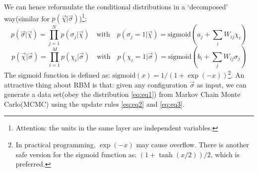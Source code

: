 \documentclass[letterpaper, 10pt]{article}
\begin{document}
We can hence reformulate the conditional distributions in a `decomposed' way(similar for $p(\vec{\chi}|\vec{\sigma})$)\footnote{Attention: the units in the same layer are independent variables.}:
\begin{equation}
p(\vec{\sigma}|\vec{\chi}) = \prod_{j=1}^{N} p(\sigma_j | \vec{\chi}) \quad{} \mathrm{with} \quad{} p(\sigma_j=1 | \vec{\chi}) = \mathrm{sigmoid}(a_j + \sum_i W_{ij}\chi_i) \label{eq:eq2}
\end{equation}
\begin{equation}
p(\vec{\chi}|\vec{\sigma}) = \prod_{i=1}^{M} p(\chi_i | \vec{\sigma}) \quad{} \mathrm{with} \quad{} p(\chi_i=1 | \vec{\sigma}) = \mathrm{sigmoid}(b_i + \sum_j W_{ij}\sigma_j)\label{eq:eq3}
\end{equation}
The sigmoid function is defined as: $\mathrm{sigmoid}(x) = 1/(1+\exp{(-x)})$\footnote{In practical programming, $\exp(-x)$ may cause overflow. There is another safe version for the sigmoid function as: $(1+\tanh{(x/2)})/2$, which is preferred.}. An attractive thing about RBM is that: given any configuration $\vec{\sigma}$ as input, we can generate a data set(obey the distribution \ref{eq:eq1}) from Markov Chain Monte Carlo(MCMC) using the update rules \ref{eq:eq2} and \ref{eq:eq3}.
\end{document}

